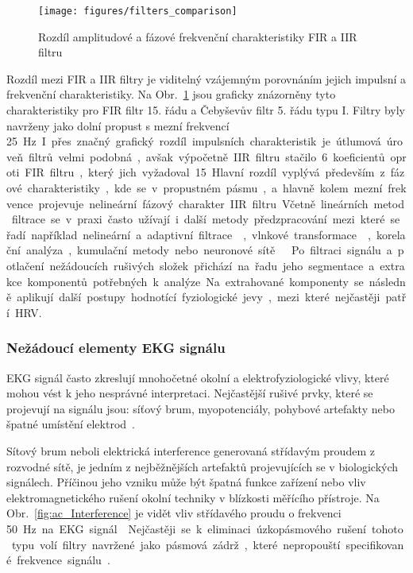 \begin{figure}[h]
	\begin{center}
		\texttt{[image: figures/filters\_comparison]}
		\caption{Rozdíl amplitudové a fázové frekvenční charakteristiky FIR a IIR filtru}
		\label{fig:filters_comparison}
	\end{center}
\end{figure}

Rozdíl mezi FIR a IIR filtry je viditelný vzájemným porovnáním jejich impulsní a
frekvenční charakteristiky. Na Obr.~\ref{fig:filters_comparison} jsou graficky
znázorněny tyto charakteristiky pro FIR filtr 15. řádu a Čebyševův filtr 5. řádu
typu I. Filtry byly navrženy jako dolní propust s mezní frekvencí 25~\si\Hz. I
přes značný grafický rozdíl impulsních charakteristik je útlumová úroveň filtrů
velmi podobná, avšak výpočetně IIR filtru stačilo 6 koeficientů oproti FIR
filtru, který jich vyžadoval 15. Hlavní rozdíl vyplývá především z fázové
charakteristiky, kde se v propustném pásmu, a hlavně kolem mezní frekvence
projevuje nelineární fázový charakter IIR filtru.

Včetně lineárních metod filtrace se v praxi často užívají i další metody
předzpracování mezi které se řadí například nelineární a adaptivní
filtrace~\cite{Sornmo1982,Pan1985}, vlnkové
transformace~\cite{Yao2020,Ndiaye2020}, korelační analýza, kumulační metody nebo
neuronové sítě~\cite{Kiranyaz2016,Zhai2018}~\cite{Jan2002}. Po filtraci signálu
a potlačení nežádoucích rušivých složek přichází na řadu jeho segmentace a
extrakce komponentů potřebných k analýze. Na extrahované komponenty se následně
aplikují další postupy hodnotící fyziologické jevy, mezi které nejčastěji patří
HRV.

\subsubsection{Nežádoucí elementy EKG signálu}
\label{section:artifacts_theory}
EKG signál často zkreslují mnohočetné okolní a elektrofyziologické vlivy, které
mohou vést k jeho nesprávné interpretaci. Nejčastější rušivé prvky, které se
projevují na signálu jsou: síťový brum, myopotenciály, pohybové artefakty nebo
špatné umístění elektrod~\cite{Surawicz2008}.

Sítový brum neboli elektrická interference generovaná střídavým proudem z
rozvodné sítě, je jedním z nejběžnějších artefaktů projevujících se v
biologických signálech. Příčinou jeho vzniku může být špatná funkce zařízení nebo
vliv elektromagnetického rušení okolní techniky v blízkosti měřícího přístroje.
Na Obr.~\ref{fig:ac_Interference} je vidět vliv střídavého proudu o frekvenci
50~\si\Hz~na EKG signál~\cite{Goldberger2017}. Nejčastěji se k eliminaci
úzkopásmového rušení tohoto typu volí filtry navržené jako pásmová zádrž, které
nepropouští specifikované frekvence signálu~\cite{Kher2019}.

